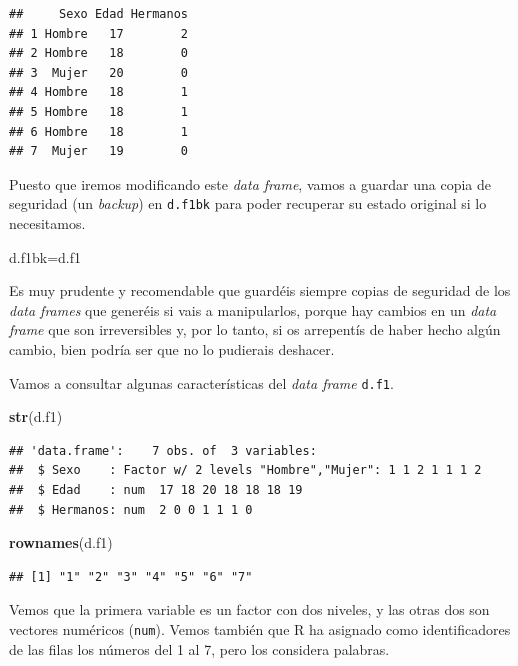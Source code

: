 \documentclass[]{book}
\newenvironment{Shaded}{\begin{snugshade}}{\end{snugshade}}
\newcommand{\KeywordTok}[1]{\textcolor[rgb]{0.13,0.29,0.53}{\textbf{#1}}}
\newcommand{\NormalTok}[1]{#1}
\theoremstyle{definition}
\theoremstyle{definition}
\theoremstyle{definition}
\theoremstyle{remark}
\begin{document}
\begin{verbatim}
##     Sexo Edad Hermanos
## 1 Hombre   17        2
## 2 Hombre   18        0
## 3  Mujer   20        0
## 4 Hombre   18        1
## 5 Hombre   18        1
## 6 Hombre   18        1
## 7  Mujer   19        0
\end{verbatim}

Puesto que iremos modificando este \emph{data frame}, vamos a guardar una copia de seguridad (un \emph{backup}) en \texttt{d.f1bk} para poder recuperar su estado original si lo necesitamos.

\begin{Shaded}
\begin{Highlighting}[]
\NormalTok{d.f1bk=d.f1}
\end{Highlighting}
\end{Shaded}

Es muy prudente y recomendable que guardéis siempre copias de seguridad de los \emph{data frames} que generéis si vais a manipularlos, porque hay cambios en un \emph{data frame} que son irreversibles y, por lo tanto, si os arrepentís de haber hecho algún cambio, bien podría ser que no lo pudierais deshacer.

Vamos a consultar algunas características del \emph{data frame} \texttt{d.f1}.

\begin{Shaded}
\begin{Highlighting}[]
\KeywordTok{str}\NormalTok{(d.f1)}
\end{Highlighting}
\end{Shaded}

\begin{verbatim}
## 'data.frame':    7 obs. of  3 variables:
##  $ Sexo    : Factor w/ 2 levels "Hombre","Mujer": 1 1 2 1 1 1 2
##  $ Edad    : num  17 18 20 18 18 18 19
##  $ Hermanos: num  2 0 0 1 1 1 0
\end{verbatim}

\begin{Shaded}
\begin{Highlighting}[]
\KeywordTok{rownames}\NormalTok{(d.f1)}
\end{Highlighting}
\end{Shaded}

\begin{verbatim}
## [1] "1" "2" "3" "4" "5" "6" "7"
\end{verbatim}

Vemos que la primera variable es un factor con dos niveles, y las otras dos son vectores numéricos (\texttt{num}). Vemos también que R ha asignado como identificadores de las filas los números del 1 al 7, pero los considera palabras.
\end{document}
